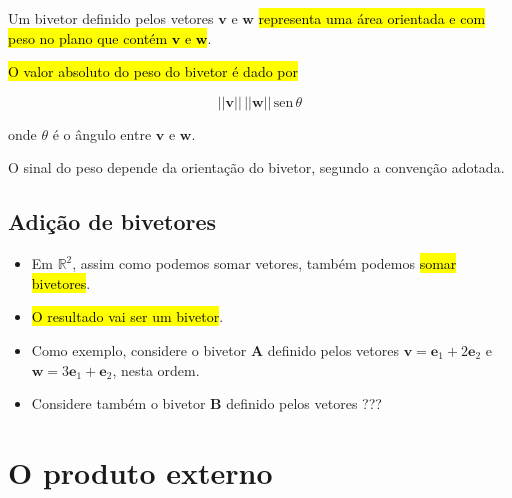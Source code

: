 \documentclass[
  letterpaper,
  DIV=11,
  numbers=noendperiod]{scrreprt}
\begin{document}
\begin{itemize}
  \begin{tcolorbox}[standard jigsaw,colframe=quarto-callout-note-color-frame, toptitle=1mm, colback=white, bottomtitle=1mm, coltitle=black, titlerule=0mm, opacitybacktitle=0.6, arc=.35mm, toprule=.15mm, opacityback=0, bottomrule=.15mm, rightrule=.15mm, colbacktitle=quarto-callout-note-color!10!white, leftrule=.75mm, title=\textcolor{quarto-callout-note-color}{\faInfo}\hspace{0.5em}{Resumindo: bivetores \(=\) áreas orientadas e com peso}, left=2mm]
  Um bivetor definido pelos vetores $\mathbf{v}$ e $\mathbf{w}$
  {\hl{representa uma área orientada e com peso no plano que contém
  $\mathbf{v}$ e $\mathbf{w}$}}.

  {\hl{O valor absoluto do peso do bivetor é dado por}}

  \[
  ||\mathbf{v}||\, ||\mathbf{w}|| \,\text{sen}\,\theta
  \]

  onde $\theta$ é o ângulo entre $\mathbf{v}$ e $\mathbf{w}$.

  O sinal do peso depende da orientação do bivetor, segundo a convenção
  adotada.
  \end{tcolorbox}
\end{itemize}

\hypertarget{adiuxe7uxe3o-de-bivetores}{%
\subsection{Adição de bivetores}\label{adiuxe7uxe3o-de-bivetores}}

\begin{itemize}
\item
  Em $\mathbb{R}^2$, assim como podemos somar vetores, também podemos
  {\hl{somar bivetores}}.
\item
  {\hl{O resultado vai ser um bivetor}}.
\item
  Como exemplo, considere o bivetor $\mathbf{A}$ definido pelos vetores
  $\mathbf{v} = \mathbf{e}_{1} + 2\mathbf{e}_{2}$ e
  $\mathbf{w} = 3\mathbf{e}_{1} + \mathbf{e}_{2}$, nesta ordem.
\item
  Considere também o bivetor $\mathbf{B}$ definido pelos vetores ???
\end{itemize}

\hypertarget{o-produto-externo}{%
\section{O produto externo}\label{o-produto-externo}}
\end{document}
